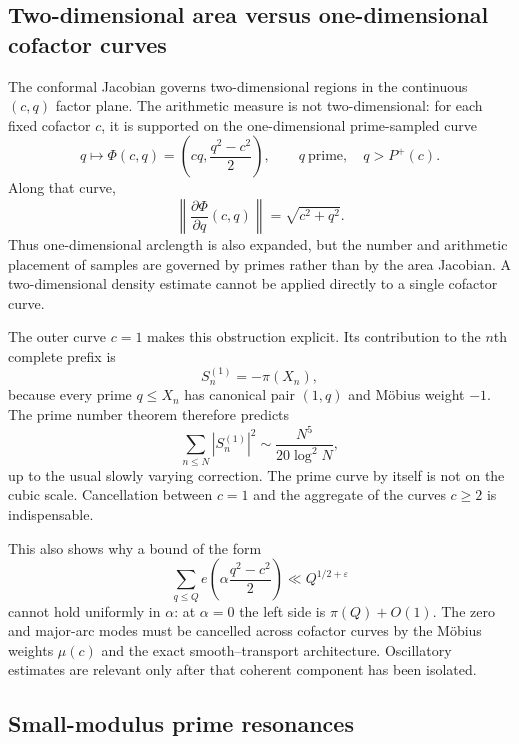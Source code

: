 \documentclass[11pt]{article}
\theoremstyle{definition}
\newcommand{\eps}{\varepsilon}
\newcommand{\Pplus}{P^{+}}
\newcommand{\1}{\mathbf{1}}
\begin{document}
\subsection{Two-dimensional area versus one-dimensional cofactor curves}
\label{subsec:curve-versus-area}

The conformal Jacobian governs two-dimensional regions in the continuous $(c,q)$ factor plane.  The arithmetic measure is not two-dimensional: for each fixed cofactor $c$, it is supported on the one-dimensional prime-sampled curve
\[
 q\longmapsto
 \Phi(c,q)
 =
 \left(cq,\frac{q^2-c^2}{2}\right),
 \qquad
 q\ \text{prime},\quad q>\Pplus(c).
\]
Along that curve,
\begin{equation}
 \left\lVert\frac{\partial\Phi}{\partial q}(c,q)\right\rVert
 =
 \sqrt{c^2+q^2}.
 \label{eq:curve-length-expansion}
\end{equation}
Thus one-dimensional arclength is also expanded, but the number and arithmetic placement of samples are governed by primes rather than by the area Jacobian.  A two-dimensional density estimate cannot be applied directly to a single cofactor curve.

The outer curve $c=1$ makes this obstruction explicit.  Its contribution to the $n$th complete prefix is
\begin{equation}
 S_n^{(1)}
 =
 -\pi(X_n),
 \label{eq:prime-curve-prefix}
\end{equation}
because every prime $q\le X_n$ has canonical pair $(1,q)$ and M\"obius weight $-1$.  The prime number theorem therefore predicts
\begin{equation}
 \sum_{n\le N}|S_n^{(1)}|^2
 \sim
 \frac{N^5}{20\log^2 N},
 \label{eq:prime-curve-asymptotic}
\end{equation}
up to the usual slowly varying correction.  The prime curve by itself is not on the cubic scale.  Cancellation between $c=1$ and the aggregate of the curves $c\ge2$ is indispensable.

This also shows why a bound of the form
\[
 \sum_{q\le Q}e\!\left(\alpha\frac{q^2-c^2}{2}\right)
 \ll Q^{1/2+\eps}
\]
cannot hold uniformly in $\alpha$: at $\alpha=0$ the left side is $\pi(Q)+O(1)$.  The zero and major-arc modes must be cancelled across cofactor curves by the M\"obius weights $\mu(c)$ and the exact smooth--transport architecture.  Oscillatory estimates are relevant only after that coherent component has been isolated.

\subsection{Small-modulus prime resonances}
\label{subsec:exact-prime-resonances}
\end{document}
